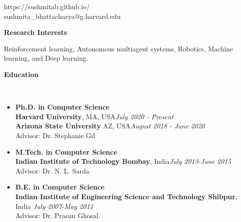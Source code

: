 \documentclass[a4paper,11pt]{article}
\newcommand{\lsep}{-0.5cm}
\newcommand{\resheading}[1]{{\small \colorbox{mygrey}{\begin{minipage}{0.975\textwidth}{\textbf{#1 \vphantom{p\^{E}}}}\end{minipage}}}}
\begin{document}
	
	\hfill https://sushmitab.github.io/\\
	\hfill sushmita\_bhattacharya@g.harvard.edu\\
	\setlength{\tabcolsep}{5pt}
	
	\vspace{10pt}
	
	\resheading{\textbf{\large Research Interests}}
	\begin{description}
		\item \hspace{0.75 cm} Reinforcement learning, Autonomous multiagent systems, Robotics, Machine learning, and Deep learning.
	\end{description}
	
	
	
	\resheading{\textbf{\large Education} }\\[\lsep]
	\begin{description}
		\item 
		\begin{itemize}
			\item \textbf{Ph.D. in Computer Science}\\
			\textbf{Harvard  University}, MA, USA\hfill\textit{July 2020 - Present}\\
			\textbf{Arizona State University} AZ, USA\hfill \textit{August 2018 - June 2020}\\
			Advisor: Dr. Stephanie Gil
		\end{itemize}
		\item
		\begin{itemize}
			\item \textbf{M.Tech. in Computer Science}\\
			\textbf{Indian Institute of Technology Bombay}, India\hfill\textit{July 2013-June 2015}\\
			Advisor: Dr. N. L. Sarda
		\end{itemize}
		\item
		\begin{itemize}
			\item\textbf{B.E. in Computer Science} \hfill\\
			\textbf{Indian Institute of Engineering Science and Technology Shibpur}, India
			\hfill \textit{July 2007-May 2011}\\
			Advisor: Dr. Prasun Ghosal.
		\end{itemize}
	\end{description}
	
\end{document}
